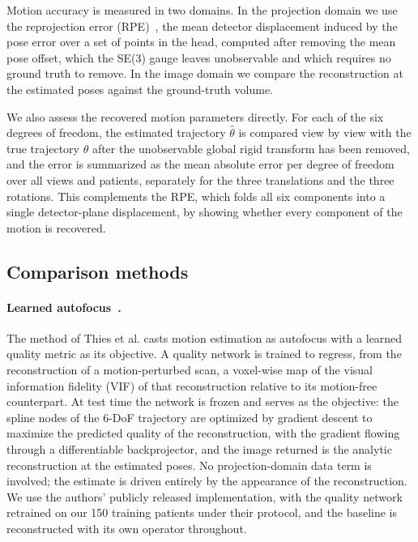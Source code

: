 \documentclass[11pt]{article}
\newcommand{\thetahat}{\hat\theta}
\begin{document}
Motion accuracy is measured in two domains. In the projection domain we use the
reprojection error (RPE)~\cite{thies25}, the mean detector displacement induced by the
pose error over a set of points in the head, computed after removing the mean pose offset,
which the SE(3) gauge leaves unobservable and which requires no ground truth to remove. In
the
image domain we compare the reconstruction at the estimated poses against the
ground-truth volume.

We also assess the recovered motion parameters directly. For each of the six degrees of
freedom, the estimated trajectory $\thetahat$ is compared view by view with the true
trajectory $\theta$ after the unobservable global rigid transform has been removed, and
the error is summarized as the mean absolute error per degree of freedom over all views
and patients, separately for the three translations and the three rotations. This
complements the RPE, which folds all six components into a single detector-plane
displacement, by showing whether every component of the motion is recovered.

\subsection{Comparison methods}
\label{sec:baselines}

\paragraph{Learned autofocus~\cite{thies25}.}
The method of Thies et al. casts motion estimation as autofocus with a learned quality
metric as its objective. A quality
network is trained to regress, from the reconstruction of a motion-perturbed scan, a
voxel-wise map of the visual information fidelity (VIF) of that reconstruction relative to
its motion-free counterpart. At test time the network is frozen and serves as the
objective: the spline nodes of the 6-DoF trajectory are optimized by gradient descent to
maximize the predicted quality of the reconstruction, with the gradient flowing through a
differentiable backprojector, and the image returned is the analytic reconstruction at the
estimated poses. No projection-domain data term is involved; the estimate is driven
entirely by the appearance of the reconstruction. We use the authors' publicly released
implementation, with the quality network retrained on our 150 training patients under
their protocol, and the baseline is reconstructed with its own operator throughout.
\end{document}
